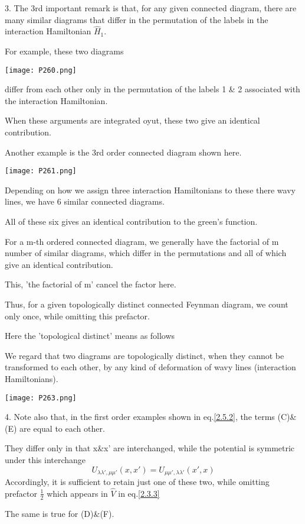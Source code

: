 3. The 3rd important remark is that, for any given connected diagram, there are many similar diagrams that differ in the permutation of the labels in the interaction Hamiltonian $\hat H_1$.

For example, these two diagrams 
\begin{center}
\texttt{[image: P260.png]}
\end{center}
differ from each other only in the permutation of the labels 1 \& 2 associated with the interaction Hamiltonian.

When these arguments are integrated oyut, these two give an identical contribution.

Another example is the 3rd order connected diagram shown here.
\begin{center}
\texttt{[image: P261.png]}
\end{center}
Depending on how we assign three interaction Hamiltonians to these there wavy lines, we have 6 similar connected diagrams.

All of these six gives an identical contribution to the green's function.

For a m-th ordered connected diagram, we generally have the factorial of m number of similar diagrams, which differ in the permutations and all of which give an identical contribution.

This, 'the factorial of m' cancel the factor here.

Thus, for a given topologically distinct connected Feynman diagram, we count only once, while omitting this prefactor.

Here the 'topological distinct' means as follows

We regard that two diagrams are topologically distinct, when they cannot be transformed to each other, by any kind of deformation of wavy lines (interaction Hamiltonians).
\begin{center}
\texttt{[image: P263.png]}
\end{center}
4. Note also that, in the first order examples shown in eq.\eqref{2.5.2}, the terms (C)\&(E) are equal to each other.

They differ only in that x\&x' are interchanged, while the potential is symmetric under this interchange
$$U_{\lambda\lambda',\mu\mu'}(x,x')=U_{\mu\mu',\lambda\lambda'}(x',x)$$
Accordingly, it is sufficient to retain just one of these two, while omitting prefactor $\frac{1}{2}$ which appears in $\hat V$ in eq.\eqref{2.3.3}


The same is true for (D)\&(F).

